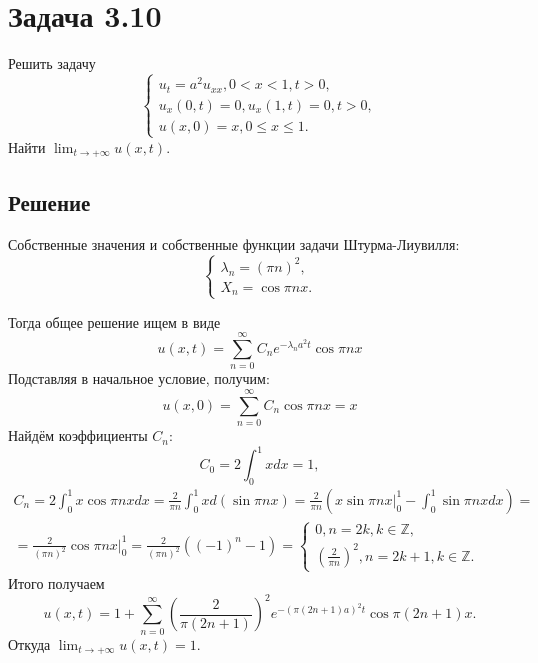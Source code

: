 \documentclass[11pt]{article}
\begin{document}
\section{Задача 3.10}
\label{sec:orgea09119}
Решить задачу
\begin{equation}
\begin{cases}
u_t = a^2u_{xx}, 0 < x < 1, t > 0, \\
u_x(0, t) = 0, u_x(1, t) = 0, t > 0, \\
u(x, 0) = x, 0 \leq x \leq 1.
\end{cases}
\end{equation}
Найти $\lim_{t \to +\infty}u(x, t)$.
\subsection{Решение}
\label{sec:org74dfc5f}
Собственные значения и собственные функции задачи Штурма-Лиувилля:
\begin{equation*}
\begin{cases}
\lambda_n = \left(\pi n\right)^2, \\
X_n = \cos\pi nx.
\end{cases}
\end{equation*}

Тогда общее решение ищем в виде
\begin{equation*}
u(x, t) = \sum_{n = 0}^{\infty}C_ne^{-\lambda_na^2t}\cos\pi nx
\end{equation*}
Подставляя в начальное условие, получим:
\begin{equation*}
u(x, 0) = \sum_{n = 0}^{\infty}C_n\cos\pi nx = x
\end{equation*}
Найдём коэффициенты $C_n$:
\begin{equation*}
C_0 = 2\int_0^1xdx = 1,
\end{equation*}
\begin{multline*}
C_n = 2\int_0^1x\cos\pi nxdx = \frac2{\pi n}\int_0^1xd(\sin\pi nx) = \frac2{\pi n}(x\sin\pi nx|_0^1 - \int_0^1\sin\pi nxdx) = \\
= \frac2{(\pi n)^2}\cos\pi nx|_0^1 = \frac2{(\pi n)^2}((-1)^n - 1) =
\begin{cases}
0, n = 2k, k \in \mathbb{Z}, \\
\left(\frac2{\pi n}\right)^2, n = 2k + 1, k \in \mathbb{Z}.
\end{cases}
\end{multline*}
Итого получаем
\begin{equation}
u(x, t) = 1 + \sum_{n = 0}^{\infty}\left(\frac2{\pi(2n + 1)}\right)^2e^{-(\pi(2n + 1)a)^2t}\cos\pi(2n + 1)x.
\end{equation}
Откуда $\lim_{t \to +\infty}u(x, t) = 1$.
\end{document}
